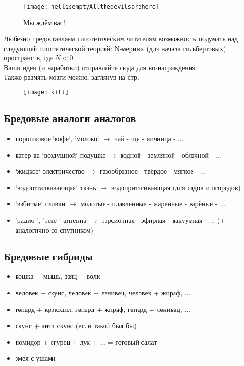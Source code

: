 \begin{figure}[ht!]
    \centering
    \texttt{[image: hellisemptyAllthedevilsarehere]}
    \caption{Мы ждём вас!}
\end{figure}

Любезно предоставляем гипотетическим читателям возможность подумать над следующей гипотетической теорией:
N-мерных (для начала гильбертовых) пространств, где \( N < 0 \).\\
Ваши идеи (и наработки) отправляйте \href{http://www.abelprize.no/}{сюда} для вознаграждения.\\
Также размять мозги можно, заглянув на стр. \pageref{mietka}
\begin{figure}[ht!]
    \centering
    \texttt{[image: kill]}
\end{figure}

\subsection{Бредовые аналоги аналогов}
\begin{itemize}
    \item порошковое `кофе`, `молоко` \( \to \) чай - щи - яичница - ...
    \item катер на `воздушной` подушке \( \to \) водной - земляной - облачной - ...
    \item `жидкое` электричество \( \to \) газообразное - твёрдое - мягкое - ...
    \item `водоотталкивающая` ткань \( \to \) водопритягивающая (для садов и огородов)
    \item `взбитые` сливки \( \to \) молотые - плавленные - жаренные - варёные - ...
    \item `радио-`, `теле-` антенна \( \to \) торсионная - эфирная - вакуумная - ... (+ аналогично со спутником)
\end{itemize}

\subsection{Бредовые гибриды}
\begin{itemize}
    \item кошка + мышь, заяц + волк
    \item человек + скунс, человек + ленивец, человек + жираф, ...
    \item гепард + крокодил, гепард + жираф, гепард + ленивец, ...
    \item скунс + анти скунс (если такой был бы)
    \item помидор + огурец + лук + ... = готовый салат
    \item змея с ушами
\end{itemize}

